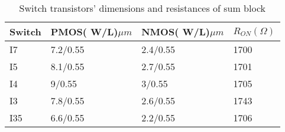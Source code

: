 \begin{appendices}
\begin{table}[H]
\centering
\caption{Switch transistors' dimensions and resistances of sum block}
\label{R_on_sum}
\begin{tabular}{|l|l|l|l|}
\hline
Switch & PMOS( W/L)$\mu m$ & NMOS( W/L)$\mu m$ & $R_{ON} (\Omega)$   \\ \hline
I7    & 7.2/0.55  & 2.4/0.55   & 1700 \\ \hline
I5     & 8.1/0.55  & 2.7/0.55   & 1701 \\ \hline
I4    & 9/0.55  & 3/0.55   & 1705 \\ \hline
I3    & 7.8/0.55  & 2.6/0.55   & 1743 \\ \hline
I35    & 6.6/0.55  & 2.2/0.55   & 1706 \\ \hline
\end{tabular}
\end{table}

\end{appendices}